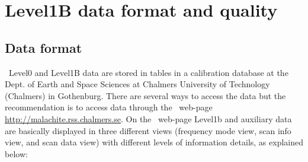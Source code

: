 
\chapter{Level1B data format and quality}


\section{Data format}

\smr\ Level0 and Level1B data are stored in tables
in a calibration database at the Dept. of Earth and Space
Sciences at Chalmers University of Technology (Chalmers) in Gothenburg.
There are several ways to access the data but the recommendation is to access
data through the \smr\ web-page \url{http://malachite.rss.chalmers.se}. 
On the \smr\ web-page Level1b and auxiliary data are basically displayed in three different
views (frequency mode view, scan info view, and scan data view) with different levels
of information details, as explained below:
